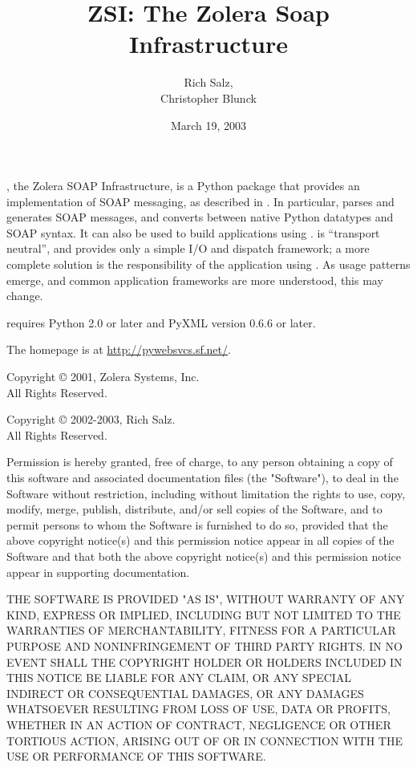 \documentclass{manual}
\title{ZSI: The Zolera Soap Infrastructure}
\author{Rich Salz,\\
        Christopher Blunck}
\date{March 19, 2003}%
\begin{document}
\maketitle

\centerline{}

\ZSI{}, the Zolera SOAP Infrastructure, is a Python package that
provides an implementation of SOAP messaging, as described in
.
In particular, \ZSI{} parses and generates SOAP messages, and
converts between native Python datatypes and SOAP syntax.
It can also be used to build applications using
.
\ZSI{} is ``transport neutral'', and provides only a simple
I/O and dispatch framework; a more complete solution is the
responsibility of the application using \ZSI{}.
As usage patterns emerge, and common application frameworks are
more understood, this may change.

\ZSI{} requires Python 2.0 or later and PyXML version 0.6.6 or later.

The \ZSI{} homepage is at \url{http://pywebsvcs.sf.net/}.

\vfill

\centerline{}

Copyright \copyright{} 2001, Zolera Systems, Inc.\\
All Rights Reserved.

Copyright \copyright{} 2002-2003, Rich Salz.\\
All Rights Reserved.

Permission is hereby granted, free of charge, to any person obtaining a
copy of this software and associated documentation files (the "Software"),
to deal in the Software without restriction, including without limitation
the rights to use, copy, modify, merge, publish, distribute, and/or
sell copies of the Software, and to permit persons to whom the Software
is furnished to do so, provided that the above copyright notice(s) and
this permission notice appear in all copies of the Software and that
both the above copyright notice(s) and this permission notice appear in
supporting documentation.

THE SOFTWARE IS PROVIDED "AS IS", WITHOUT WARRANTY OF ANY KIND,
EXPRESS OR IMPLIED, INCLUDING BUT NOT LIMITED TO THE WARRANTIES OF
MERCHANTABILITY, FITNESS FOR A PARTICULAR PURPOSE AND NONINFRINGEMENT
OF THIRD PARTY RIGHTS. IN NO EVENT SHALL THE COPYRIGHT HOLDER OR HOLDERS
INCLUDED IN THIS NOTICE BE LIABLE FOR ANY CLAIM, OR ANY SPECIAL INDIRECT
OR CONSEQUENTIAL DAMAGES, OR ANY DAMAGES WHATSOEVER RESULTING FROM LOSS
OF USE, DATA OR PROFITS, WHETHER IN AN ACTION OF CONTRACT, NEGLIGENCE
OR OTHER TORTIOUS ACTION, ARISING OUT OF OR IN CONNECTION WITH THE USE
OR PERFORMANCE OF THIS SOFTWARE.
\end{document}
